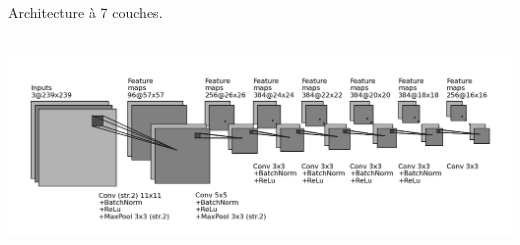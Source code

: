 \documentclass[10pt,twocolumn,letterpaper,french]{article}
\begin{document}
\begin{appendices}
    Architecture à 7 couches.
    \begin{center}
    \includegraphics[height=160pt]{images/archis/convnet_cnn7.png}
    \end{center} 




  \end{appendices}
\end{document}
